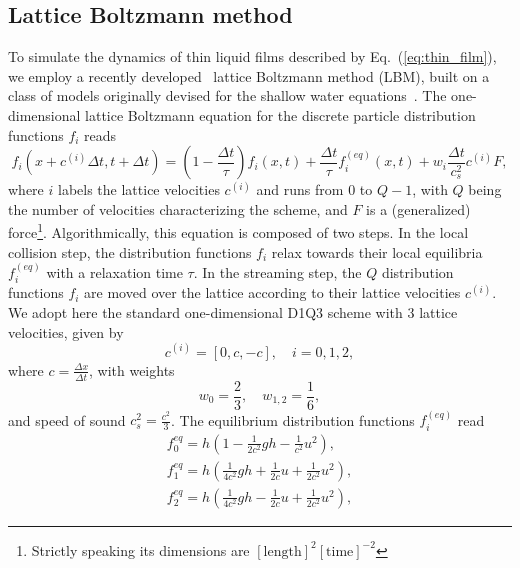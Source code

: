 \subsection{Lattice Boltzmann method}\label{subsec:LBM}
To simulate the dynamics of thin liquid films described by Eq.~(\ref{eq:thin_film}), we employ a recently developed~\cite{zitzLatticeBoltzmannMethod2019} lattice Boltzmann method (LBM), built on a class of models originally devised for the shallow water equations~\cite{salmonLatticeBoltzmannMethod1999,dellarNonhydrodynamicModesPriori2002,zhouLatticeBoltzmannMethods2004,vanthangStudy1DLattice2010}.
The one-dimensional lattice Boltzmann equation for the discrete particle distribution functions $f_i$ reads
\begin{equation}\label{eq:LBE_two}
        f_i(x+c^{(i)}\Delta t,t+\Delta t) = \left(1 - \frac{\Delta t}{\tau}\right) f_i(x,t) + \frac{\Delta t}{\tau} f_i^{(eq)}(x,t) + w_i \frac{\Delta t}{c_s^2} c^{(i)} F,
\end{equation}
where $i$ labels the lattice velocities $c^{(i)}$ and runs from $0$ to $Q-1$, with $Q$ being the number of velocities characterizing the scheme, and $F$ is a (generalized) force\footnote{Strictly speaking its dimensions are $[\text{length}]^2[\text{time}]^{-2}$}.
Algorithmically, this equation is composed of two steps.
In the local collision step, the distribution functions $f_i$ relax towards their local equilibria $f^{(eq)}_i$ with a relaxation time $\tau$.
In the streaming step, the $Q$ distribution functions $f_i$ are moved over the lattice according to their lattice velocities $c^{(i)}$.
We adopt here the standard one-dimensional D1Q3 scheme with $3$ lattice velocities, given by
\begin{equation}\label{eq:speeds_two}
c^{(i)}  = [0, c, -c], \quad i = 0, 1, 2,
\end{equation}
where $c=\frac{\Delta x}{\Delta t}$, with weights
\begin{equation}
w_0 = \frac{2}{3},\quad w_{1,2} = \frac{1}{6},
\end{equation}
and speed of sound $c_s^2=\frac{c^2}{3}$.
The equilibrium distribution functions $f_i^{(eq)}$ read~\cite{vanthangStudy1DLattice2010}
\begin{gather}
    f_{0}^{eq} = h\left(1-\frac{1}{2c^2}gh - \frac{1}{c^2}u^2\right),\nonumber\\
    f_{1}^{eq} = h\left(\frac{1}{4c^2}gh + \frac{1}{2c}u + \frac{1}{2c^2}u^2\right)\label{eq:equilibria_two},\\
    f_{2}^{eq} = h\left(\frac{1}{4c^2}gh - \frac{1}{2c}u + \frac{1}{2c^2}u^2\right),\nonumber
\end{gather}
